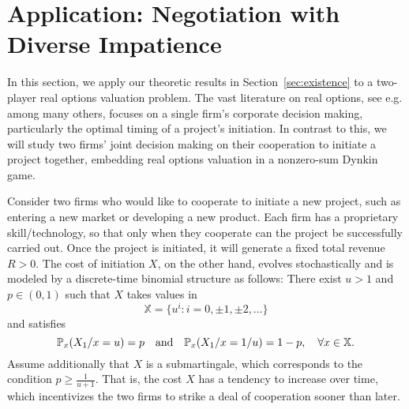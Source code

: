 \documentclass[11pt,reqno]{article}
\numberwithin{equation}{section}
\renewcommand{\P}{\mathbb{P}}
\newcommand{\X}{\mathbb{X}}
\begin{document}

\section{Application: Negotiation with Diverse Impatience}\label{sec:application}
In this section, we apply our theoretic results in Section~\ref{sec:existence} to a two-player real options valuation problem. The vast literature on real options, see e.g. \cite{MS86, Dixit94, Smith95} among many others, focuses on a single firm's corporate decision making, particularly the optimal timing of a project's initiation. In contrast to this, we will study two firms' joint decision making on their cooperation to initiate a project together, embedding real options valuation in a nonzero-sum Dynkin game.  

Consider two firms who would like to cooperate to initiate a new project, such as entering a new market or developing a new product. Each firm has a proprietary skill/technology, so that only when they cooperate can the project be successfully carried out. Once the project is initiated, it will generate a fixed total revenue $R>0$. The cost of initiation $X$, on the other hand, evolves stochastically and is modeled by a discrete-time binomial structure as follows: There exist $u>1$ and $p\in(0,1)$ such that $X$ takes values in 
\begin{equation}
\X = \{u^i: i = 0, \pm1, \pm2, \dotso\}\label{X app}
\end{equation}
and satisfies
\[
\P_x(X_{1}/x = u)=p\quad \hbox{and}\quad \P_x(X_{1}/x = 1/u)=1-p,\quad \forall x\in\X.
\]
Assume additionally that $X$ is a submartingale, which corresponds to the condition 
$p\ge \frac{1}{u+1}$.
That is, the cost $X$ has a tendency to increase over time, which incentivizes the two firms to strike a deal of cooperation sooner than later.  
\end{document}
